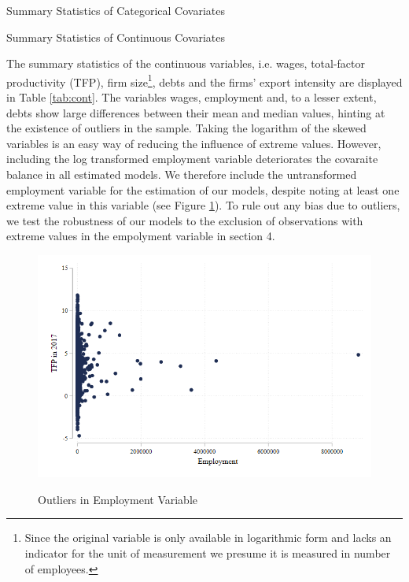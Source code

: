 \documentclass[a4paper,11pt]{scrartcl}
\begin{document}
\begin{table}[h!]
	\centering
	\caption{Summary Statistics of Categorical Covariates} 
	
	\label{tab:cat}	
\end{table}

\begin{table}[h!]
	\centering
	\caption{Summary Statistics of Continuous Covariates} 
	
	\label{tab:cont}
\end{table}
\newpage

The summary statistics of the continuous variables, i.e. wages,  total-factor productivity (TFP), firm size\footnote{Since the original variable is only available in logarithmic form and lacks an indicator for the unit of measurement we presume it is measured in number of employees.}, debts and the firms' export intensity are displayed in Table \ref{tab:cont}. The variables wages, employment and, to a lesser extent, debts show large differences between their mean and median values, hinting at the existence of outliers in the sample. Taking the logarithm of the skewed variables is an easy way of reducing the influence of extreme values. However, including the log transformed employment variable deteriorates the covaraite balance in all estimated models. We therefore include the untransformed employment variable for the estimation of our models, despite noting at least one extreme value in this variable (see Figure \ref{fig:outliers}). To rule out any bias due to outliers, we test the robustness of our models to the exclusion of observations with extreme values in the empolyment variable in section 4.


\begin{figure}[h!]\centering
	\caption{Outliers in Employment Variable}
	\includegraphics[width=\textwidth]{emp15_outliers}
  	\label{fig:outliers}
\end{figure} 
\newpage
\end{document}
